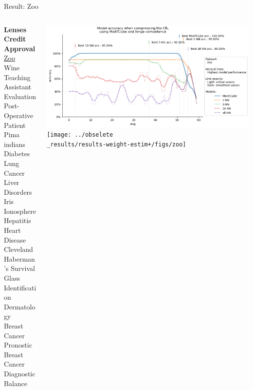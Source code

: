 \documentclass[]{beamer}
\begin{document}
\begin{frame}{Result: Zoo}
    \begin{columns}
        \begin{column}{.3\textwidth}
            {\smaller\smaller\smaller
            \textbf{Lenses} \\
            \textbf{Credit Approval} \\
            \underline{Zoo} \\
            Wine \\
            Teaching Assistant Evaluation \\
            Post-Operative Patient \\
            Pima indians Diabetes \\
            Lung Cancer \\
            Liver Disorders \\
            Iris \\
            Ionosphere \\
            Hepatitis \\
            Heart Disease Cleveland \\
            Haberman's Survival \\
            Glass Identification \\
            Dermatology \\
            Breast Cancer Pronostic \\
            Breast Cancer Diagnostic \\
            Balance\\
            ~}
        \end{column}
        \begin{column}{.7\textwidth}
            \includegraphics[width=\textwidth]{../results-no-sim-tuning+/figs/zoo}
            \texttt{[image: ../obselete\\\_results/results-weight-estim+/figs/zoo]}
        \end{column}
    \end{columns}
\end{frame}
\end{document}
